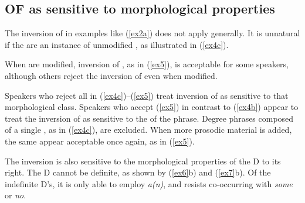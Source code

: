 \documentclass[output=paper,
modfonts
]{LSP/langsci}
\begin{document}
\subsection{OF as sensitive to morphological properties}
The inversion of  in examples like ({\ref{ex2a}}) does not apply generally.  It is unnatural if the  are an instance of unmodified , as illustrated in ({\ref{ex4c}}).
\begin{exe}
\ex \label{ex4c}
\begin{xlist}
\end{xlist}
\end{exe}

When  are modified, inversion of , as in ({\ref{ex5}}), is acceptable for some speakers, although others reject the inversion of  even when modified.
\begin{exe}
\ex \label{ex5}
\begin{xlist}
\end{xlist}
\end{exe}

Speakers who reject all  in ({\ref{ex4c}})--({\ref{ex5}}) treat inversion of  as sensitive to that morphological class.  Speakers who accept ({\ref{ex5}}) in contrast to ({\ref{ex4b}}) appear to treat the inversion of  as sensitive to the  of the phrase.  Degree phrases composed of a single , as in ({\ref{ex4c}}), are excluded.  When more prosodic material is added, the same  appear acceptable once again, as in ({\ref{ex5}}).  


The inversion is also sensitive to the morphological properties of the D to its right.  The D cannot be definite, as shown by ({\ref{ex6}}b) and ({\ref{ex7}}b).  Of the indefinite D's, it is only able to employ {\textit{a(n)}}, and resists co-occurring with {\textit{some}} or {\textit{no}}.
\end{document}
